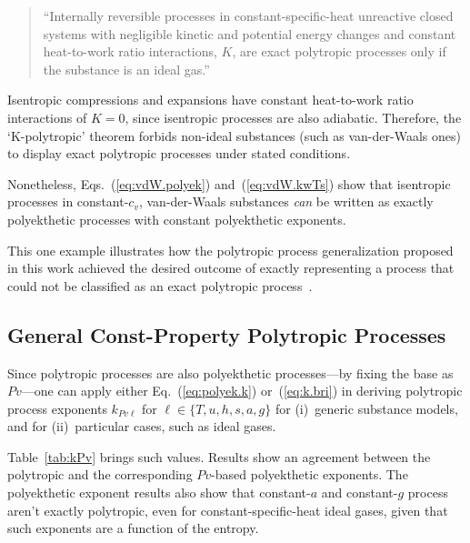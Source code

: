    \begin{quote}
        ``Internally reversible processes in constant-specific-heat  unreactive  closed  systems
        with negligible kinetic and potential energy changes  and  constant  heat-to-work  ratio
        interactions, $K$, are exact polytropic processes only if  the  substance  is  an  ideal
        gas.''
    \end{quote}

    Isentropic compressions and expansions have  constant  heat-to-work  ratio  interactions  of
    $K=0$, since isentropic processes are also adiabatic. Therefore, the `K-polytropic'  theorem
    forbids non-ideal substances (such  as  van-der-Waals  ones)  to  display  exact  polytropic
    processes under stated conditions.

    Nonetheless,  Eqs.~(\ref{eq:vdW.polyek})  and~(\ref{eq:vdW.kwTs})   show   that   isentropic
    processes in constant-$c_v$, van-der-Waals  substances  \emph{can}  be  written  as  exactly
    polyekthetic processes with constant polyekthetic exponents.

    This one example illustrates how the polytropic process generalization proposed in this work
    achieved the desired outcome of exactly representing a process that could not be  classified
    as an exact polytropic process~\cite{2020-NaaktgeborenC-engrXiv}.

    \subsection{General Const-Property Polytropic Processes}

    Since  polytropic  processes  are  also  polyekthetic  processes---by  fixing  the  base  as
    $Pv$---one  can  apply  either  Eq.~(\ref{eq:polyek.k})  or~(\ref{eq:k.bri})   in   deriving
    polytropic process exponents  $k_{Pv\ell}$  for  $\ell  \in  \{T,  u,  h,  s,  a,  g\}$  for
    (i)~generic substance models, and for (ii)~particular cases, such as ideal gases.

    Table~\ref{tab:kPv} brings such values. Results show an agreement between the polytropic and
    the corresponding $Pv$-based polyekthetic exponents. The polyekthetic exponent results  also
    show that  constant-$a$  and  constant-$g$  process  aren't  exactly  polytropic,  even  for
    constant-specific-heat ideal gases, given that such exponents are a function of the entropy.

